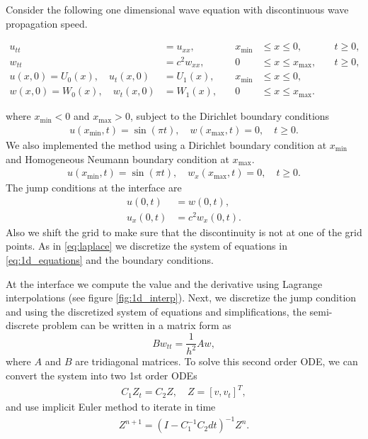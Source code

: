 \documentclass[10pt,a4paper,twoside, french]{article}
\numberwithin{equation}{section}
\numberwithin{figure}{section}
\numberwithin{table}{section}
\begin{document}
Consider the following one dimensional wave equation with discontinuous wave propagation speed. 
\begin{center}
\begin{minipage}[c]{.7\textwidth}
\begin{align}
u_{tt} &= u_{xx}, \quad &x_{\min}&\leq x\leq 0, \quad &t\geq0,\\
w_{tt} &= c^2w_{xx}, \quad &0&\leq x\leq x_{\max}, \quad &t\geq0,\\
u(x,0) = U_0(x), \quad u_t(x,0) &= U_1(x), \quad &x_{\min}&\leq x\leq 0,\\
w(x,0) = W_0(x), \quad w_t(x,0) &= W_1(x), \quad &0&\leq x\leq x_{\max}.
\label{eq:1d_equations}
\end{align}
\end{minipage}
\end{center}

where $x_{\min}<0$ and $x_{\max}>0$, subject to the Dirichlet boundary conditions
\begin{align}
u(x_{\min},t) = \sin(\pi t), \quad w(x_{\max},t) = 0, \quad t\geq 0.
\label{eq:1d_bc_1}
\end{align}
We also implemented the method using a Dirichlet boundary condition at $x_{\min}$ and Homogeneous Neumann boundary condition at $x_{\max}$. 
\begin{align}
u(x_{\min},t) = \sin(\pi t), \quad w_x(x_{\max},t) = 0, \quad t\geq 0.
\label{eq:1d_bc_2}
\end{align}
The jump conditions at the interface are
\begin{align}
u(0,t) &= w(0,t), \nonumber \\
u_x(0,t) &= c^2w_x(0,t).
\label{eq:1d_jump}
\end{align}
Also we shift the grid to make sure that the discontinuity is not at one of the grid points. As in \eqref{eq:laplace} we discretize the system of equations in \eqref{eq:1d_equations} and the  boundary conditions.

At the interface we compute the value and the derivative using Lagrange interpolations (see figure \ref{fig:1d_interp}). Next, we discretize the jump condition and using the discretized system of equations and simplifications, the semi- discrete problem can be written in a matrix form as 
$$Bw_{tt}=\frac{1}{h^2}Aw,$$
where $A$ and $B$ are tridiagonal matrices. To solve this second order ODE, we can convert the system into two 1st order ODEs 
\begin{align}
C_1 Z_t = C_2 Z, \quad Z = [v, v_t]^T,
\end{align}
and use implicit Euler method to iterate in time
\begin{align}
Z^{n+1} = (I-C_1^{-1}C_2dt)^{-1}Z^n.
\end{align} 
\end{document}
